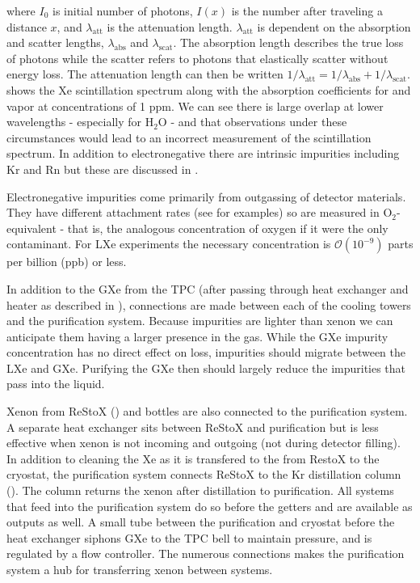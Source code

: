 where $I_0$ is initial number of photons, $I(x)$ is the number after traveling a distance $x$, and $\lambda_{\mathrm{att}}$ is the
attenuation length.  $\lambda_{\mathrm{att}}$ is dependent on the absorption and scatter lengths, $\lambda_{\mathrm{abs}}$ and
$\lambda_{\mathrm{scat}}$.  The absorption length describes the true loss of photons while the scatter refers to photons that elastically
scatter without energy loss.  The attenuation length can then be written
$1 / \lambda_{\mathrm{att}} = 1 / \lambda_{\mathrm{abs}} + 1 / \lambda_{\mathrm{scat}}$.   shows
the Xe scintillation spectrum along with the absorption coefficients for \otwo and \htwoo vapor at concentrations of 1 ppm.  We can see
there is large overlap at lower wavelengths - especially for H$_2$O - and that observations under these circumstances would lead to an
incorrect measurement of the scintillation spectrum.  In addition to electronegative there are intrinsic
impurities including Kr and Rn but these are discussed in .

Electronegative impurities come primarily from outgassing of detector materials.  They have different \electron attachment rates (see
 for examples) so are measured in O$_2$-equivalent - that is, the analogous concentration of oxygen if it
were the only contaminant.  For LXe experiments the necessary concentration is $\mathcal{O}(10^{-9})$ parts per billion (ppb) or less.

In addition
to the GXe from the TPC (after passing through heat exchanger and heater as described in ), connections are
made between
each of the cooling towers and the purification system.  Because impurities are lighter than xenon we can anticipate them having a larger
presence in the gas.  While the GXe impurity concentration has no direct effect on \electron loss, impurities should migrate between the
LXe and GXe.  Purifying the GXe then should largely reduce the impurities that pass into the liquid.

Xenon from ReStoX  () and bottles are also connected to the purification system.  A separate heat exchanger
sits between ReStoX and purification but is less effective when xenon is not incoming and outgoing (not during detector filling).  In
addition to cleaning the Xe as it is transfered to the from RestoX to the cryostat, the purification system connects ReStoX to the Kr
distillation column ().  The column returns the xenon after distillation to purification.  All systems that
feed into the purification system do so before the getters and are available as outputs as well.  A small tube between the purification
and cryostat before the heat exchanger siphons GXe to the TPC bell to maintain pressure, and is regulated by a flow controller.  The
numerous connections makes the purification system a hub for transferring xenon between systems.

